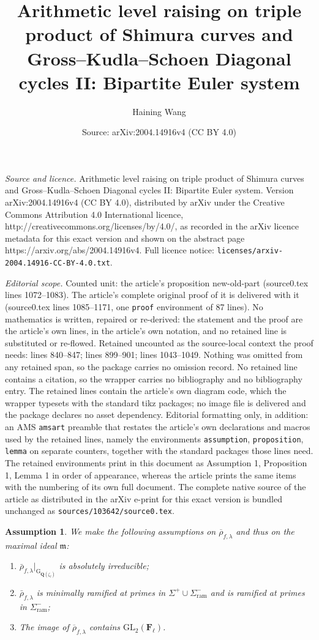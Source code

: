 \documentclass[10pt,a4paper]{amsart}
\title{Arithmetic level raising on triple product of Shimura curves and Gross--Kudla--Schoen Diagonal cycles II: Bipartite Euler system}
\author{Haining Wang}
\date{Source: arXiv:2004.14916v4 (CC BY 4.0)}
\newtheorem{assumption}{Assumption}
\def\FF{\mathbf{F}}
\def\GL{\mathrm{GL}}
\def\QQ{\mathbf{Q}}
\def\frakm{\mathfrak{m}}
\def\ram{\mathrm{ram}}
\def\rmG{\mathrm{G}}
\begin{document}
\maketitle

\noindent\emph{Source and licence.} Arithmetic level raising on triple product of Shimura curves and Gross--Kudla--Schoen Diagonal cycles II: Bipartite Euler system. Version arXiv:2004.14916v4 (CC BY 4.0), distributed by arXiv under the Creative Commons Attribution 4.0 International licence, http://creativecommons.org/licenses/by/4.0/, as recorded in the arXiv licence metadata for this exact version and shown on the abstract page https://arxiv.org/abs/2004.14916v4. Full licence notice: \texttt{licenses/arxiv-2004.14916-CC-BY-4.0.txt}.\par\smallskip

\noindent\textit{Editorial scope.} Counted unit: the article's proposition new-old-part (source0.tex lines 1072--1083). The article's complete original proof of it is delivered with it (source0.tex lines 1085--1171, one \texttt{proof} environment of 87 lines). No mathematics is written, repaired or re-derived: the statement and the proof are the article's own lines, in the article's own notation, and no retained line is substituted or re-flowed.  Retained uncounted as the source-local context the proof needs: lines 840--847; lines 899--901; lines 1043--1049.  Nothing was omitted from any retained span, so the package carries no omission record.  No retained line contains a citation, so the wrapper carries no bibliography and no bibliography entry.  The retained lines contain the article's own diagram code, which the wrapper typesets with the standard tikz packages; no image file is delivered and the package declares no asset dependency.  Editorial formatting only, in addition: an AMS \texttt{amsart} preamble that restates the article's own declarations and macros used by the retained lines, namely the environments \texttt{assumption}, \texttt{proposition}, \texttt{lemma} on separate counters, together with the standard packages those lines need.  The retained environments print in this document as Assumption 1, Proposition 1, Lemma 1 in order of appearance, whereas the article prints the same items with the numbering of its own full document.  The complete native source of the article as distributed in the arXiv e-print for this exact version is bundled unchanged as \texttt{sources/103642/source0.tex}.
\begin{assumption}\label{assump}
We make the following assumptions on $\overline{\rho}_{f, \lambda}$ and thus on the maximal ideal $\frakm$:
\begin{enumerate}
\item $\bar{\rho}_{f, \lambda}\vert_{\rmG_{\QQ(\zeta_{\ell})}}$ is absolutely irreducible;
\item $\bar{\rho}_{f, \lambda}$ is minimally ramified at primes in $\Sigma^{+}\cup\Sigma^{-}_{\ram}$ and is ramified at primes in $\Sigma^{-}_{\ram}$;
\item The image of $\overline{\rho}_{f, \lambda}$ contains $\GL_{2}(\FF_{\ell})$.
\end{enumerate}
\end{assumption}
\end{document}
